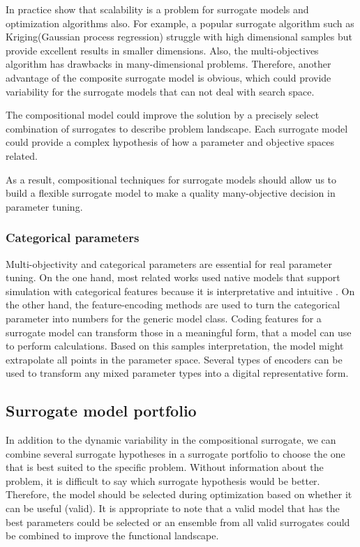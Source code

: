                 In practice show that scalability is a problem for surrogate models and optimization algorithms also. For example, a popular surrogate algorithm such as Kriging(Gaussian process regression) struggle with high dimensional samples but provide excellent results in smaller dimensions. Also, the multi-objectives algorithm has drawbacks in many-dimensional problems. Therefore, another advantage of the composite surrogate model is obvious, which could provide variability for the surrogate models that can not deal with search space.
                
                The compositional model could improve the solution by a precisely select combination of surrogates to describe problem landscape. Each surrogate model could provide a complex hypothesis of how a parameter and objective spaces related.
                
                As a result, compositional techniques for surrogate models should allow us to build a flexible surrogate model to make a quality many-objective decision in parameter tuning.

            \subsubsection{Categorical parameters} 
                Multi-objectivity and categorical parameters are essential for real parameter tuning. On the one hand, most related works used native models that support simulation with categorical features because it is interpretative and intuitive \cite{HutterHL11, nardi2019practical}. On the other hand, the feature-encoding methods are used to turn the categorical parameter into numbers for the generic model class. Coding features for a surrogate model can transform those in a meaningful form, that a model can use to perform calculations. Based on this samples interpretation, the model might extrapolate all points in the parameter space. Several types of encoders can be used to transform any mixed parameter types into a digital representative form.
            
        
        \subsection{Surrogate model portfolio}
            In addition to the dynamic variability in the compositional surrogate, we can combine several surrogate hypotheses in a surrogate portfolio to choose the one that is best suited to the specific problem.  Without information about the problem, it is difficult to say which surrogate hypothesis would be better. Therefore, the model should be selected during optimization based on whether it can be useful (valid). It is appropriate to note that a valid model that has the best parameters could be selected or an ensemble from all valid surrogates could be combined to improve the functional landscape.

